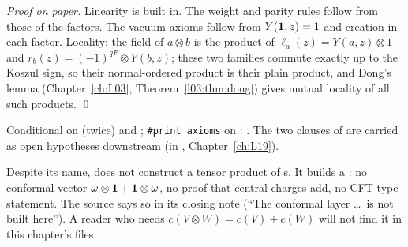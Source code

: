 \emph{Proof on paper.} Linearity is built in. The weight and parity rules follow from those of the
factors. The vacuum axioms follow from $Y(\mathbf{1},z) = 1$ and creation in each factor. Locality: the
field of $a\otimes b$ is the product of $\ell_a(z) = Y(a,z)\otimes1$ and $r_b(z) = (-1)^{qF}\otimes
Y(b,z)$; these two families commute exactly up to the Koszul sign, so their normal-ordered product is
their plain product, and Dong's lemma (Chapter~\ref{ch:L03}, Theorem~\ref{l03:thm:dong}) gives mutual locality of all such
products. \qed
\begin{status}
Conditional on  (twice) and ; \texttt{\#print axioms}
on : . The two clauses of
 are carried as open hypotheses downstream (in
, Chapter~\ref{ch:L19}).
\end{status}

\begin{warning}[title={Trap / dead end: There is no tensor product of vertex operator algebras in the library}]\label{l04:warn:tensor}
Despite its name,  does not construct a tensor
product of s. It builds a : no conformal vector
$\omega\otimes\mathbf{1}+\mathbf{1}\otimes\omega$, no proof that central charges add, no CFT-type statement.
The source says so in its closing note (``The conformal layer \ldots\ is not built here''). A reader
who needs $c(V\otimes W) = c(V)+c(W)$ will not find it in this chapter's files.
\end{warning}

